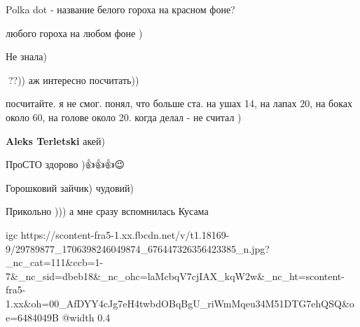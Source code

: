  
 
 
 
 

\qqSecCmt


Polka dot - название белого гороха на красном фоне?

\begin{itemize} %

любого гороха на любом фоне )


Не знала)
\end{itemize} %


💯??)) аж интересно посчитать))

\begin{itemize} %

посчитайте. я не смог. понял, что больше ста. на ушах 14, на лапах 20, на боках
около 60, на голове около 20. когда делал - не считал )

\textbf{Aleks Terletski} акей)


ПроСТО здорово )👍👍👍😉🎨

\end{itemize} %


Горошковий зайчик) чудовий)


Прикольно ))) а мне сразу вспомнилась Кусама

\ifcmt
  igc https://scontent-fra5-1.xx.fbcdn.net/v/t1.18169-9/29789877_1706398246049874_676447326356423385_n.jpg?_nc_cat=111&ccb=1-7&_nc_sid=dbeb18&_nc_ohc=laMcbqV7cjIAX_kqW2w&_nc_ht=scontent-fra5-1.xx&oh=00_AfDYY4cJg7eH4twbdOBqBgU_riWmMqeu34M51DTG7ehQSQ&oe=6484049B
	@width 0.4
\fi
